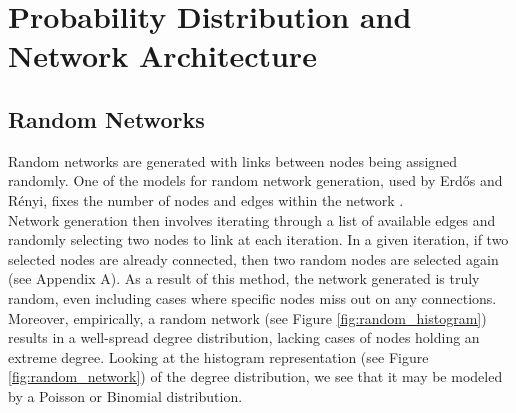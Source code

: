 \documentclass[journal]{IEEEtran}
\begin{document}



\begin{figure}[!ht]
\end{figure}

\section{Probability Distribution and Network Architecture}
\subsection{Random Networks}

\noindent Random networks are generated with links between nodes being assigned randomly. One of the models for random network generation, used by Erdős and Rényi, fixes the number of nodes and edges within the network \cite{barabasi2016network}. \\

\noindent Network generation then involves iterating through a list of available edges and randomly selecting two nodes to link at each iteration. In a given iteration, if two selected nodes are already connected, then two random nodes are selected again (see Appendix A). As a result of this method, the network generated is truly random, even including cases where specific nodes miss out on any connections. Moreover, empirically, a random network (see Figure \ref{fig:random_histogram}) results in a well-spread degree distribution, lacking cases of nodes holding an extreme degree. Looking at the histogram representation (see Figure \ref{fig:random_network}) of the degree distribution, we see that it may be modeled by a Poisson or Binomial distribution.\\
\end{document}
